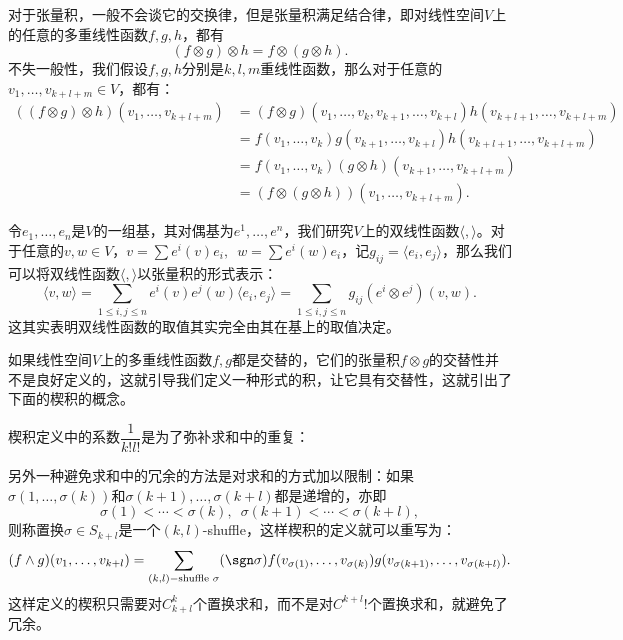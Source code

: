     对于张量积，一般不会谈它的交换律，但是张量积满足结合律，即对线性空间\(V\)上的任意的多重线性函数\(f,g,h\)，都有\[(f\otimes g)\otimes h = f\otimes(g\otimes h).\]
    不失一般性，我们假设\(f,g,h\)分别是\(k,l,m\)重线性函数，那么对于任意的\(v_1,\dots,v_{k+l+m}\in V\)，都有：
    \begin{equation*}
        \begin{split}
            ((f\otimes g)\otimes h)(v_1,\dots,v_{k+l+m}) &= (f\otimes g)(v_1,\dots,v_k,v_{k+1},\dots,v_{k+l})h(v_{k+l+1},\dots,v_{k+l+m})\\
            &= f(v_1,\dots,v_k)g(v_{k+1},\dots,v_{k+l})h(v_{k+l+1},\dots,v_{k+l+m})\\
            &= f(v_1,\dots,v_k)(g\otimes h)(v_{k+1},\dots,v_{k+l+m})\\
            &= (f\otimes(g\otimes h))(v_1,\dots,v_{k+l+m}).
        \end{split}
    \end{equation*}

    \begin{example}[张量积视角下的双线性函数]
        令\(e_1,\dots,e_n\)是\(V\)的一组基，其对偶基为\(e^1,\dots,e^n\)，我们研究\(V\)上的双线性函数\(\langle,\rangle\)。对于任意的\(v,w\in V\)，\enspace\(v = \sum e^i(v)e_i,\enspace w = \sum e^i(w)e_i\)，记\(g_{ij} = \langle e_i,e_j\rangle\)，那么我们可以将双线性函数\(\langle,\rangle\)以张量积的形式表示：\[\langle v, w\rangle  = \sum_{1\leq i,j\leq n} e^i(v)e^j(w)\langle e_i,e_j\rangle = \sum_{1\leq i,j\leq n} g_{ij}(e^i\otimes e^j)(v,w).\]
        这其实表明双线性函数的取值其实完全由其在基上的取值决定。
    \end{example}

    如果线性空间\(V\)上的多重线性函数\(f,g\)都是交替的，它们的张量积\(f\otimes g\)的交替性并不是良好定义的，这就引导我们定义一种形式的积，让它具有交替性，这就引出了下面的{\heiti 楔积}的概念。

    \begin{definition}[楔积]
        
    \end{definition}
    
    楔积定义中的系数\(\dfrac{1}{k!l!}\)是为了弥补求和中的重复：

    另外一种避免求和中的冗余的方法是对求和的方式加以限制：如果\(\sigma(1,\dots,\sigma(k))\)和\(\sigma(k+1),\dots,\sigma(k+l)\)都是递增的，亦即\[\sigma(1)<\cdots<\sigma(k),\enspace\sigma(k+1)<\cdots<\sigma(k+l),\]则称置换\(\sigma\in S_{k+l}\)是一个\((k,l)\)-{\heiti shuffle}，这样楔积的定义就可以重写为：\[(f\wedge g)(v_1,\dots,v_{k+l}) = \sum_{(k,l)-\text{shuffle }\sigma}(\sgn\sigma)f(v_{\sigma(1)},\dots,v_{\sigma(k)})g(v_{\sigma(k+1)},\dots,v_{\sigma(k+l)}).\]
    这样定义的楔积只需要对\(C^{k}_{k+l}\)个置换求和，而不是对\(C^{k+l}!\)个置换求和，就避免了冗余。

